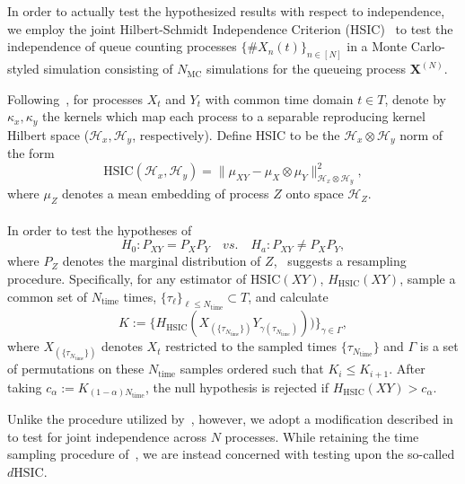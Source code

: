 In order to actually test the hypothesized results with respect to independence, we employ the joint Hilbert-Schmidt Independence Criterion (HSIC)~\cite{jointindep} to test the independence of queue counting processes $\{\#X_{n}(t)\}_{n \in [N]}$ in a Monte Carlo-styled
simulation consisting of $N_{\text{MC}}$ simulations for the queueing process $\mathbf{X}^{(N)}$.
\begin{definition}

    \label{hsichat}
    Following~\cite{nonstat}, for processes $X_{t}$ and $Y_{t}$ with common time domain $t \in T$, denote by $\kappa_{x}, \kappa_{y}$ the kernels which
    map each process to a separable reproducing kernel Hilbert space ($\mathcal{H}_{x}, \mathcal{H}_{y}$, respectively).
    Define HSIC to be the $\mathcal{H}_{x} \otimes \mathcal{H}_{y}$ norm of the form
    \[\text{HSIC}(\mathcal{H}_{x},\mathcal{H}_{y}) = \|\mu_{XY} - \mu_{X} \otimes \mu_{Y}\|^{2}_{\mathcal{H}_{x} \otimes \mathcal{H}_{y}},\]
    where $\mu_{Z}$ denotes a mean embedding of process $Z$ onto space $\mathcal{H}_{Z}$.
    \\~\\
    In order to test the hypotheses of
    \[H_{0}: P_{XY} = P_{X}P_{Y} \quad vs. \quad H_{a}: P_{XY} \not = P_{X}P_{Y},\]
    where $P_{Z}$ denotes the marginal distribution of $Z$,~\cite{nonstat} suggests a resampling procedure.
    Specifically, for any estimator of $\text{HSIC}(XY)$, ${H_{\text{HSIC}}}(XY)$, sample a common set of $N_{\text{time}}$ times, $\{\tau_{\ell}\}_{\ell \leq N_{\text{time}}} \subset T$, and calculate
    \[K :=\{H_{\text{HSIC}}(X_{(\{\tau_{N_{\text{time}}}\})}Y_{\gamma(\tau_{N_{\text{time}}})}))\}_{\gamma \in \Gamma},\]
    where $X_{(\{\tau_{N_{\text{time}}}\})}$ denotes $X_{t}$ restricted to the sampled times $\{\tau_{N_{\text{time}}}\}$ and $\Gamma$ is a set of permutations on these $N_{\text{time}}$ samples ordered such that $K_{i} \leq K_{i+1}$.
    After taking $c_{\alpha} :=  K_{(1-\alpha)N_{\text{time}}}$, the null hypothesis is rejected if $H_{\text{HSIC}}(XY) > c_{\alpha}$.
\end{definition}

Unlike the procedure utilized by~\cite{nonstat}, however, we adopt a modification described in~\cite{jointindep} to test for joint independence across $N$ processes.
While retaining the time sampling procedure of~\cite{nonstat}, we are instead concerned with testing upon the so-called $d\text{HSIC}$.

